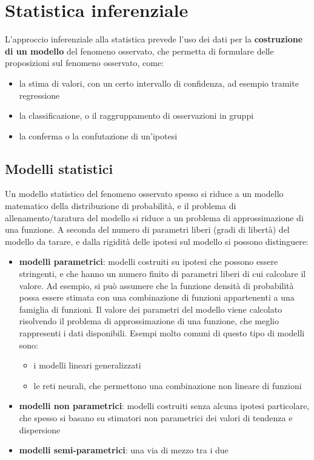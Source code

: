 \section{Statistica inferenziale}
\begin{definition} L'approccio inferenziale alla statistica prevede l'uso dei dati per la \textbf{costruzione di un modello} del fenomeno osservato, che permetta di formulare delle proposizioni sul fenomeno osservato, come:
\begin{itemize}
    \item la stima di valori, con un certo intervallo di confidenza, ad esempio tramite regressione
    \item la classificazione, o il raggruppamento di osservazioni in gruppi
    \item la conferma o la confutazione di un'ipotesi
\end{itemize}
\end{definition}

\subsection{Modelli statistici}
Un modello statistico del fenomeno osservato spesso si riduce a un modello matematico della distribuzione di probabilità, e il problema di allenamento/taratura del modello si riduce a un problema di approssimazione di una funzione. A seconda del numero di parametri liberi (gradi di libertà) del modello da tarare, e dalla rigidità delle ipotesi sul modello si possono distinguere:
\begin{itemize}
    \item \textbf{modelli parametrici}: modelli costruiti su ipotesi che possono essere stringenti, e che hanno un numero finito di parametri liberi di cui calcolare il valore. Ad esempio, si può assumere che la funzione densità di probabilità possa essere stimata con una combinazione di funzioni appartenenti a una famiglia di funzioni. Il valore dei parametri del modello viene calcolato risolvendo il problema di approssimazione di una funzione, che meglio rappresenti i dati disponibili. Esempi molto comuni di questo tipo di modelli sono:
    \begin{itemize}
        \item i modelli lineari generalizzati
        \item le reti neurali, che permettono una combinazione non lineare di funzioni
    \end{itemize}
    \item \textbf{modelli non parametrici}: modelli costruiti senza alcuna ipotesi particolare, che spesso si basano su stimatori non parametrici dei valori di tendenza e dispersione
    \item \textbf{modelli semi-parametrici}: una via di mezzo tra i due
\end{itemize}

